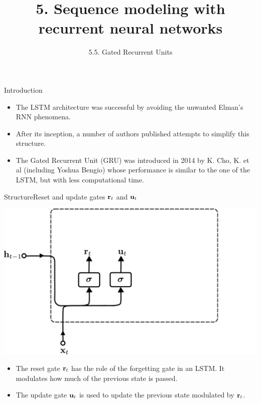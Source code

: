 \documentclass{beamer}
\title[5. Recurrent neural networks]{5. Sequence modeling with recurrent neural networks}
\subtitle{5.5. Gated Recurrent Units}
\begin{document}
\maketitle

\begin{frame}{Introduction}
\begin{itemize} 
\item The LSTM architecture was successful by avoiding the unwanted Elman's RNN phenomena. 
\item After its inception, a number of authors published attempts to simplify this structure. 
\item The Gated Recurrent Unit (GRU) was introduced in 2014 by K. Cho, K. et al (including Yoshua Bengio) whose performance is similar to the one of the LSTM, but with less computational time. 
\end{itemize}
\end{frame}


\begin{frame}{Structure}{Reset and update gates ${\bf r}_t$  and ${\bf u}_t$}
\begin{center}
    \includegraphics[scale=0.4]{Module 5 (RNN)/pics/GRU_reset_update.pdf}
\end{center}

\begin{itemize} 
\item The reset gate ${\bf r}_t$ has the role of the forgetting gate in an LSTM. It modulates how much of the previous state is passed. 
\item The update gate ${\bf u}_t$ is used to update the previous state modulated by ${\bf r}_t$.  
\end{itemize}
\end{frame}
\end{document}
